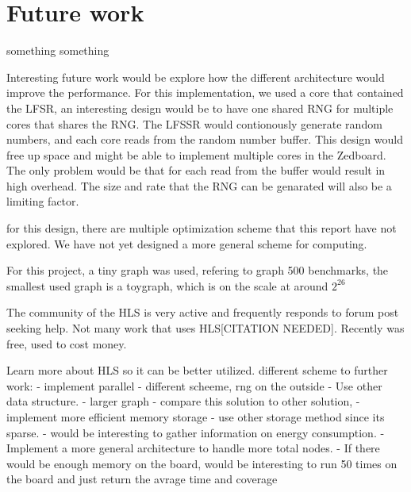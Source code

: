 \chapter{Future work} \label{futureWork}
something something

Interesting future work would be explore how the different architecture would improve the performance. For this implementation, we used a core that contained the LFSR, an interesting design would be to have one shared RNG for multiple cores that shares the RNG. The LFSSR would contionously generate random numbers, and each core reads from the random number buffer. This design would free up space and might be able to implement multiple cores in the Zedboard. The only problem would be that for each read from the buffer would result in high overhead. The size and rate that the RNG can be genarated will also be a limiting factor.

for this design, there are multiple optimization scheme that this report have not explored. We have not yet designed a more general scheme for computing. 

For this project, a tiny graph was used, refering to graph 500 benchmarks, the smallest used graph is a toygraph, which is on the scale at around $2^26$

The community of the HLS is very active and frequently responds to forum post seeking help.	Not many work that uses HLS[CITATION NEEDED]. Recently was free, used to cost money.


Learn more about HLS so it can be better utilized. 
different scheme to further work:
- implement parallel
- different scheeme, rng on the outside
- Use other data structure.
- larger graph
- compare this solution to other solution, 
- implement more efficient memory storage
- use other storage method since its sparse. 
- would be interesting to gather information on  energy consumption.
- Implement a more general architecture to handle more total nodes.
- If  there would be enough memory on the board, would be interesting to run 50 times on the board and just return the avrage time and coverage
